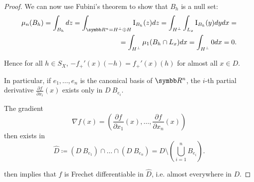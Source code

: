 \begin{proof}
  We can now use Fubini's theorem to show that \( B_h \) is a null set:
  \begin{align*}
    \mu_n(B_h)
    =
    \int_{B_h} dz
    =
    \int_{\R^n = H^\perp \oplus H} \Ind_{B_h} (z) dz
    =
    \int_{H^\perp} \int_{L_x} \Ind_{B_h} (y) dy dx
    = \\ =
    \int_{H^\perp} \mu_1(B_h \cap L_x) dx
    =
    \int_{H^\perp} 0 dx
    =
    0.
  \end{align*}

  Hence for all \( h \in S_X \), \( -f_+'(x)(-h) = f_+'(x)(h) \) for almost all \( x \in D \).

  In particular, if \( e_1, \ldots, e_n \) is the canonical basis of \( \R^n \), the \( i \)-th partial derivative \( \frac{\partial f} {\partial x_i} (x) \) exists only in \( D \ B_{e_i} \).

  The gradient
  \begin{equation*}
    \nabla f(x) = \left( \frac{\partial f} {\partial x_1} (x), \ldots, \frac{\partial f} {\partial x_n} (x) \right)
  \end{equation*}
  then exists in
  \begin{equation*}
    \hat D \coloneqq (D \ B_{e_1}) \cap \ldots \cap (D \ B_{e_n}) = D \setminus \left( \bigcup_{i=1}^n B_{e_i} \right).
  \end{equation*}

   then implies that \( f \) is Frechet differentiable in \( \hat D \), i.e. almost everywhere in \( D \).
\end{proof}
